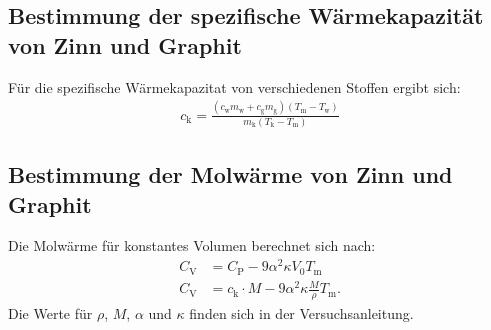 \subsection{Bestimmung der spezifische Wärmekapazität von Zinn und Graphit}
Für die spezifische Wärmekapazitat von verschiedenen Stoffen ergibt sich:
\begin{align}
c_\mathrm{k}=\frac{(c_\mathrm{w} m_\mathrm{w}+c_\mathrm{g} m_\mathrm{g})(T_\mathrm{m}-T_\mathrm{w})}{m_\mathrm{k}(T_\mathrm{k}-T_\mathrm{m})}
\end{align}

\subsection{Bestimmung der Molwärme von Zinn und Graphit}
Die Molwärme für konstantes Volumen berechnet sich nach:
\begin{align*}
  C_\mathrm{V}&=C_\mathrm{P}-9\alpha^2\kappa V_\mathrm{0}T_\mathrm{m}\\
  C_\mathrm{V}&=c_\mathrm{k}\cdot M-9\alpha^2\kappa \frac{M}{\rho}T_\mathrm{m}.
\end{align*}
Die Werte für $\rho$, $M$, $\alpha$ und $\kappa$ finden sich in der Versuchsanleitung.
